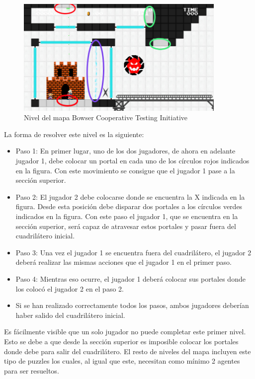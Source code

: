 \begin{figure}[ht]
    \centering
    \includegraphics[width=0.9\textwidth]{img/mario-1-level.png}
    \caption{Nivel del mapa Bowser Cooperative Testing Initiative \cite {mari0-mapa}}
    \label{fig:mapa}
\end{figure}

La forma de resolver este nivel es la siguiente:
\begin{itemize}
    \item Paso 1: En primer lugar, uno de los dos jugadores, de ahora en adelante jugador 1, debe colocar un portal en cada uno de los círculos rojos indicados en la figura. Con este movimiento se consigue que el jugador 1 pase a la sección superior.
    \item Paso 2: El jugador 2 debe colocarse donde se encuentra la X indicada en la figura. Desde esta posición debe disparar dos portales a los círculos verdes indicados en la figura. Con este paso el jugador 1, que se encuentra en la sección superior, será capaz de atravesar estos portales y pasar fuera del cuadrilátero inicial.
    \item Paso 3: Una vez el jugador 1 se encuentra fuera del cuadrilátero, el jugador 2 deberá realizar las mismas acciones que el jugador 1 en el primer paso.
    \item Paso 4: Mientras eso ocurre, el jugador 1 deberá colocar sus portales donde los colocó el jugador 2 en el paso 2.
    \item Si se han realizado correctamente todos los pasos, ambos jugadores deberían haber salido del cuadrilátero inicial.
\end{itemize}

Es fácilmente visible que un solo jugador no puede completar este primer nivel. Esto se debe a que desde la sección superior es imposible colocar los portales donde debe para salir del cuadrilátero. El resto de niveles del mapa incluyen este tipo de puzzles los cuales, al igual que este, necesitan como mínimo 2 agentes para ser resueltos.